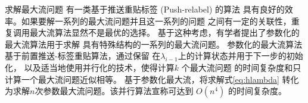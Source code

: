 %
%
%

求解最大流问题
有一类基于推送重贴标签 (Push-relabel) 的算法\cite{Goldberg1988}
具有良好的效率。如果要解一系列的最大流问题并且这一系列的问题
之间有一定的关联性，重复调用最大流算法显然不是最优的选择。
基于这种考虑，有学者提出了参数化的最大流算法\cite{Gallo1989}用于求解
具有特殊结构的一系列的最大流问题。
%
%
参数化的最大流算法
基于前置推送-标签重贴算法，通过保留
在$\lambda_{i-1}$上的计算状态并用于下一步的初始化，
以及适当地使用并行化的技术，使得计算$k$ 个最大流问题
的时间复杂度和只计算一个最大流问题近似相等。
\citet{kolmogorov} 基于参数化最大流，将求解式\eqref{eq:hlambda}
转化为求解$n$次参数最大流问题。该并行算法宣称可达到 $O(n^4)$ 的时间复杂度。


